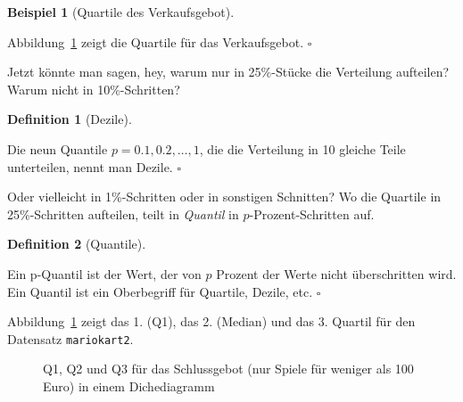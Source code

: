 \documentclass[
  letterpaper,
]{scrbook}
\theoremstyle{definition}
\theoremstyle{definition}
\newtheorem{example}{Beispiel}[chapter]
\theoremstyle{definition}
\newtheorem{definition}{Definition}[chapter]
\theoremstyle{remark}
\begin{document}
\begin{example}[Quartile des
Verkaufsgebot]\protect\hypertarget{exm-mario-qs}{}\label{exm-mario-qs}

Abbildung~\ref{fig-mario-qs1} zeigt die Quartile für das Verkaufsgebot.
\(\square\)

\end{example}

Jetzt könnte man sagen, hey, warum nur in 25\%-Stücke die Verteilung
aufteilen? Warum nicht in 10\%-Schritten?

\begin{definition}[Dezile]\protect\hypertarget{def-dezile}{}\label{def-dezile}

Die neun Quantile \(p= 0.1, 0.2, \ldots, 1\), die die Verteilung in 10
gleiche Teile unterteilen, nennt man Dezile. \(\square\)

\end{definition}

Oder vielleicht in 1\%-Schritten oder in sonstigen Schnitten? Wo die
Quartile in 25\%-Schritten aufteilen, teilt in \emph{Quantil} in
\(p\)-Prozent-Schritten auf.

\begin{definition}[Quantile]\protect\hypertarget{def-quantile}{}\label{def-quantile}

Ein p-Quantil ist der Wert, der von \(p\) Prozent der Werte nicht
überschritten wird. Ein Quantil ist ein Oberbegriff für Quartile,
Dezile, etc. \(\square\)

\end{definition}

Abbildung~\ref{fig-mario-qs1} zeigt das 1. (Q1), das 2. (Median) und das
3. Quartil für den Datensatz \texttt{mariokart2}.

\begin{figure}


\caption{\label{fig-mario-qs1}Q1, Q2 und Q3 für das Schlussgebot (nur
Spiele für weniger als 100 Euro) in einem Dichediagramm}

\end{figure}%
\end{document}
